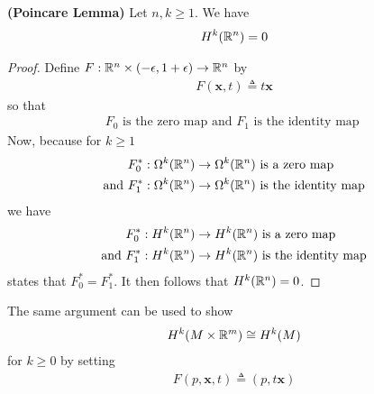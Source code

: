 \documentclass{report}
\begin{document}
\begin{corollary}
\label{PL}
\textbf{(Poincare Lemma)} Let $n,k\geq 1$. We have 
\begin{align*}
H^k(\mathbb{R}^n)=0 
\end{align*}
\end{corollary}
\begin{proof}
 Define $F:\mathbb{R}^n\times (-\epsilon ,1+\epsilon )\rightarrow \mathbb{R}^n$ by 
  \begin{align*}
  F(\textbf{x},t)\triangleq t\textbf{x}
  \end{align*}
so that 
\begin{align*}
F_0\text{ is the zero map and $F_1$ is the identity map }
\end{align*}
Now, because for $k\geq 1$
\begin{align*}
  &F_0^*:\Omega^k(\mathbb{R}^n)\rightarrow \Omega^k(\mathbb{R}^n)\text{ is a zero map } \\
  \text{ and }&F_1^* :\Omega^k(\mathbb{R}^n)\rightarrow \Omega^k (\mathbb{R}^n)\text{ is the identity map }
\end{align*}
we have 
\begin{align*}
&F_0^*:H^k(\mathbb{R}^n)\rightarrow H^k(\mathbb{R}^n)\text{ is a zero map } \\
  \text{ and }&F_1^*:H^k(\mathbb{R}^n)\rightarrow H^k(\mathbb{R}^n)\text{ is the identity map }
\end{align*}
 states that $F_0^*=F_1^*$. It then follows that $H^k(\mathbb{R}^n)=0$.
\end{proof}
\begin{mdframed}
The same argument can be used to show 
\begin{align}
\label{hkm}
H^k(M\times \mathbb{R}^m)\cong  H^k(M)
\end{align}
for $k\geq 0$ by setting 
\begin{align*}
F(p,\textbf{x},t)\triangleq (p,t \textbf{x})
\end{align*}
\end{mdframed}
\end{document}
